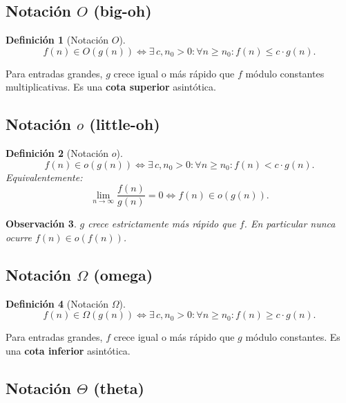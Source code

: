 \documentclass[11pt,a4paper]{article}
\theoremstyle{definicion}
\newtheorem{definicion}{Definici\'on}[section]
\newtheorem{observacion}[definicion]{Observaci\'on}
\begin{document}
\subsection{Notaci\'on $O$ (big-oh)}

\begin{definicion}[Notaci\'on $O$]
\[
f(n) \in O(g(n)) \iff \exists\, c, n_0 > 0 : \forall n \geq n_0 : f(n) \leq c \cdot g(n).
\]
\end{definicion}

\begin{intuicion}
Para entradas grandes, $g$ crece igual o m\'as r\'apido que $f$ m\'odulo constantes multiplicativas. Es una \textbf{cota superior} asint\'otica.
\end{intuicion}

\subsection{Notaci\'on $o$ (little-oh)}

\begin{definicion}[Notaci\'on $o$]
\[
f(n) \in o(g(n)) \iff \exists\, c, n_0 > 0 : \forall n \geq n_0 : f(n) < c \cdot g(n).
\]
Equivalentemente:
\[
\lim_{n \to \infty} \frac{f(n)}{g(n)} = 0 \iff f(n) \in o(g(n)).
\]
\end{definicion}

\begin{observacion}
$g$ crece \emph{estrictamente} m\'as r\'apido que $f$. En particular \emph{nunca} ocurre $f(n) \in o(f(n))$.
\end{observacion}

\subsection{Notaci\'on $\Omega$ (omega)}

\begin{definicion}[Notaci\'on $\Omega$]
\[
f(n) \in \Omega(g(n)) \iff \exists\, c, n_0 > 0 : \forall n \geq n_0 : f(n) \geq c \cdot g(n).
\]
\end{definicion}

\begin{intuicion}
Para entradas grandes, $f$ crece igual o m\'as r\'apido que $g$ m\'odulo constantes. Es una \textbf{cota inferior} asint\'otica.
\end{intuicion}

\subsection{Notaci\'on $\Theta$ (theta)}
\end{document}
